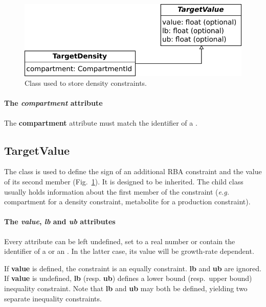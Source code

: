 \begin{figure}
  \centering
  \includegraphics[scale=0.9]{figures/parameters_target_density}
  \caption{Class used to store density constraints.}
\label{fig:parameters_target_density}
\end{figure}

\paragraph{The \textit{compartment} attribute}
The \textbf{compartment} attribute must match the identifier of a \compartment.


\subsection{TargetValue}
\label{sec:target_value}

The \targetvalue{} class is used to define the sign of an additional RBA
constraint and the value of its second member
(Fig.~\ref{fig:parameters_target_density}).
It is designed to be inherited.
The child class usually holds information about the first member of the
constraint
(\textit{e.g.} compartment for a density constraint,
metabolite for a production constraint).

\paragraph{The \textit{value}, \textit{lb} and \textit{ub} attributes}
Every attribute can be left undefined, set to a real number or
contain the identifier of a \function{} or an \aggregate.
In the latter case, its value will be growth-rate dependent.

If \textbf{value} is defined, the constraint is an equally constraint.
\textbf{lb} and \textbf{ub} are ignored.
If \textbf{value} is undefined, \textbf{lb} (resp. \textbf{ub}) defines
a lower bound (resp.\ upper bound) inequality constraint.
Note that \textbf{lb} and \textbf{ub} may both be defined, yielding two
separate inequality constraints.

